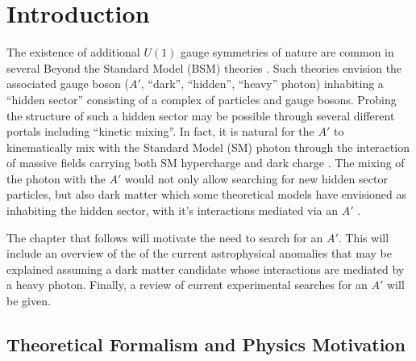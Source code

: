 \chapter{Introduction}

The existence of additional $U(1)$ gauge symmetries of nature are common in
several Beyond the Standard Model (BSM) theories \cite{goodsell2010, 
candelas1985, andreas2013, jaeckel2010}. Such theories envision the associated
gauge boson ($A'$, ``dark'', ``hidden'', ``heavy'' photon) inhabiting a 
``hidden sector''
consisting of a complex of particles and gauge bosons.  Probing the 
structure of such a hidden sector may be possible through several different portals
including ``kinetic mixing''.  In fact, it is natural for the $A'$ to 
kinematically mix with the Standard Model (SM) photon through the interaction
of massive fields carrying both SM hypercharge and dark charge \cite{holdom1986}.
The mixing of the photon with the $A'$ would not only allow searching for
new hidden sector particles, but also dark matter which some theoretical models
have envisioned as inhabiting the hidden sector, with it's interactions mediated
via an $A'$ \cite{arkani-hamed2009, pospelov2009, cheung2009, arkani-hamed2008}.

The chapter that follows will motivate the need to search for an $A'$.  
This will include an overview of the of the current astrophysical anomalies
that may be explained assuming a dark matter candidate whose interactions are 
mediated by a heavy photon.  Finally, a review of current experimental searches
for an $A'$ will be given.

\section{Theoretical Formalism and Physics Motivation}

